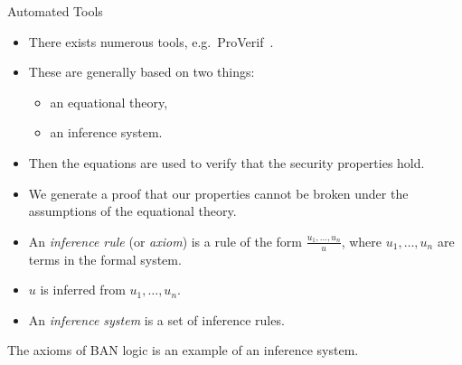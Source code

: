\begin{frame}
  \begin{block}{Automated 
      Tools}
    \begin{itemize}
      \item There exists numerous tools, e.g.\ ProVerif~\cite{ProVerif}.
      \item These are generally based on two things:
        \begin{itemize}
          \item an equational theory,
          \item an inference system.
        \end{itemize}

      \item Then the equations are used to verify that the security properties 
        hold.

      \item We generate a proof that our properties cannot be broken under the 
        assumptions of the equational theory.
    \end{itemize}
  \end{block}
\end{frame}

\begin{frame}
  \begin{definition}
    \begin{itemize}
      \item An \emph{inference rule} (or \emph{axiom}) is a rule of the form 
        \(\frac{u_1, \ldots, u_n}{u}\), where \(u_1, \ldots, u_n\) are terms in 
        the formal system.
      \item \(u\) is inferred from \(u_1, \ldots, u_n\).
      \item An \emph{inference system} is a set of inference rules.
    \end{itemize}
  \end{definition}

  \pause{}
  
  \begin{example}
    The axioms of BAN logic is an example of an inference system.
  \end{example}
\end{frame}

